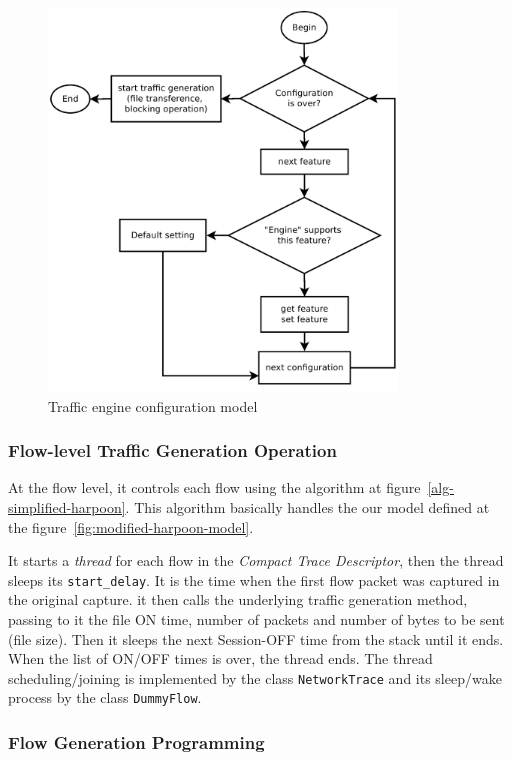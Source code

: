 \begin{figure}[ht!]
    \centering
    \includegraphics[height=4.0in]{figures/ch3/alg-traffic-engine-config}
    \caption{Traffic engine configuration model}
    \label{fig:alg-traffic-engine-config}
\end{figure}

\subsubsection{Flow-level Traffic Generation Operation}

At the flow level, it controls each flow using the algorithm at figure~\ref{alg-simplified-harpoon}. This algorithm basically handles the our model defined at the figure~\ref{fig:modified-harpoon-model}.

It starts a \textit{thread} for each flow in the \textit{Compact Trace Descriptor}, then the thread sleeps its \texttt{start\_delay}. It is the time when the first flow packet was captured in the original capture. it then calls the underlying traffic generation method, passing to it the file ON time, number of packets and number of bytes to be sent (file size). Then it sleeps the next Session-OFF time from the stack until it ends. When the list of ON/OFF times is over, the thread ends. The thread scheduling/joining is implemented by the class \texttt{NetworkTrace} and its sleep/wake process by the class \texttt{DummyFlow}.


\subsubsection{Flow Generation Programming}

